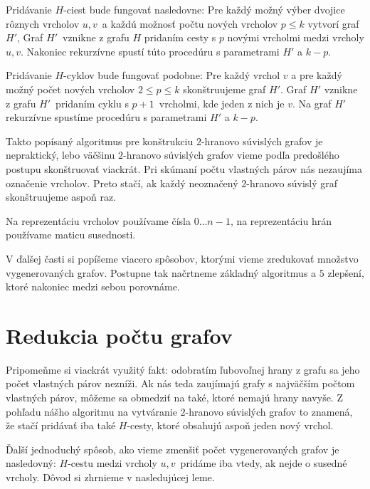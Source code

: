 Pridávanie $H$-ciest bude fungovať nasledovne: Pre každý možný výber dvojice rôznych
vrcholov $u, v$ a každú možnosť počtu nových vrcholov $p \leq k$ vytvorí graf $H'$,
Graf $H'$ vznikne z grafu $H$ pridaním cesty s $p$ novými vrcholmi medzi vrcholy $u, v$.
Nakoniec rekurzívne spustí túto procedúru s parametrami $H'$ a $k - p$.

Pridávanie $H$-cyklov bude fungovať podobne: Pre každý vrchol $v$ a pre každý možný
počet nových vrcholov $2 \leq p \leq k$ skonštruujeme graf $H'$. Graf $H'$ vznikne z
grafu $H'$ pridaním cyklu s $p+1$ vrcholmi, kde jeden z nich je $v$. Na graf $H'$
rekurzívne spustíme procedúru s parametrami $H'$ a $k - p$.

Takto popísaný algoritmus pre konštrukciu $2$-hranovo súvislých grafov je nepraktický,
lebo väčšinu $2$-hranovo súvislých grafov vieme podľa predošlého postupu skonštruovať
viackrát. Pri skúmaní počtu vlastných párov nás nezaujíma označenie vrcholov. Preto stačí,
ak každý neoznačený $2$-hranovo súvislý graf skonštruujeme aspoň raz.

Na reprezentáciu vrcholov používame čísla $0 \ldots n-1$, na reprezentáciu hrán používame
maticu susednosti.

V ďalšej časti si popíšeme viacero spôsobov, ktorými vieme zredukovať množstvo vygenerovaných
grafov. Postupne tak načrtneme základný algoritmus a $5$ zlepšení, ktoré nakoniec medzi
sebou porovnáme.

\section{Redukcia počtu grafov}

Pripomeňme si viackrát využitý fakt: odobratím ľubovoľnej hrany z grafu sa jeho počet vlastných
párov nezníži. Ak nás teda zaujímajú grafy s najväčším počtom vlastných párov, môžeme sa obmedziť
na také, ktoré nemajú hrany navyše. Z pohľadu nášho algoritmu na vytváranie $2$-hranovo súvislých
grafov to znamená, že stačí pridávať iba také $H$-cesty, ktoré obsahujú aspoň jeden nový vrchol.

Ďalší jednoduchý spôsob, ako vieme zmenšiť počet vygenerovaných grafov je nasledovný: $H$-cestu
medzi vrcholy $u, v$ pridáme iba vtedy, ak nejde o susedné vrcholy. Dôvod si zhrnieme v nasledujúcej
leme.

